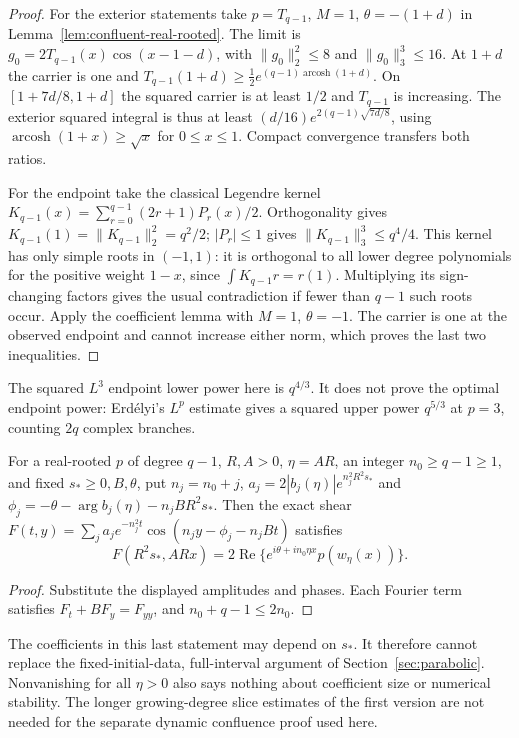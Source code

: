 \begin{proof}
For the exterior statements take $p=T_{q-1}$, $M=1$,
$\theta=-(1+d)$ in Lemma~\ref{lem:confluent-real-rooted}.
The limit is $g_0=2T_{q-1}(x)\cos(x-1-d)$, with
$\|g_0\|_2^2\le8$ and $\|g_0\|_3^3\le16$.
At $1+d$ the carrier is one and
$T_{q-1}(1+d)\ge\tfrac12e^{(q-1)\operatorname{arcosh}(1+d)}$.
On $[1+7d/8,1+d]$ the squared carrier is at least $1/2$ and
$T_{q-1}$ is increasing. The exterior squared integral is thus at least
$(d/16)e^{2(q-1)\sqrt{7d/8}}$, using
$\operatorname{arcosh}(1+x)\ge\sqrt x$ for $0\le x\le1$.
Compact convergence transfers both ratios.

For the endpoint take the classical Legendre kernel
$K_{q-1}(x)=\sum_{r=0}^{q-1}(2r+1)P_r(x)/2$.
Orthogonality gives $K_{q-1}(1)=\|K_{q-1}\|_2^2=q^2/2$;
$|P_r|\le1$ gives $\|K_{q-1}\|_3^3\le q^4/4$.
This kernel has only simple roots in $(-1,1)$: it is orthogonal to
all lower degree polynomials for the positive weight $1-x$, since
$\int K_{q-1}r=r(1)$. Multiplying its sign-changing factors gives
the usual contradiction if fewer than $q-1$ such roots occur.
Apply the coefficient lemma with $M=1$, $\theta=-1$.
The carrier is one at the observed endpoint and cannot increase either
norm, which proves the last two inequalities.
\end{proof}

The squared $L^3$ endpoint lower power here is $q^{4/3}$.
It does not prove the optimal endpoint power: Erd\'elyi's
$L^p$ estimate \cite[Theorem 2.10, arXiv v1]{Erdelyi2017}
gives a squared upper power $q^{5/3}$ at $p=3$, counting $2q$
complex branches.

\begin{proposition}
\label{thm:integer-slice}
For a real-rooted $p$ of degree $q-1$, $R,A>0$, $\eta=AR$,
an integer $n_0\ge q-1\ge1$, and fixed $s_*\ge0,B,\theta$, put
$n_j=n_0+j$, $a_j=2|b_j(\eta)|e^{n_j^2R^2s_*}$ and
$\phi_j=-\theta-\arg b_j(\eta)-n_jBR^2s_*$.
Then the exact shear
$F(t,y)=\sum_j a_je^{-n_j^2t}\cos(n_jy-\phi_j-n_jBt)$ satisfies
\[
 F(R^2s_*,ARx)=2\operatorname{Re}
       \{e^{i\theta+in_0\eta x}p(w_\eta(x))\}.
\]
\end{proposition}

\begin{proof}
Substitute the displayed amplitudes and phases. Each Fourier term
satisfies $F_t+BF_y=F_{yy}$, and $n_0+q-1\le2n_0$.
\end{proof}

The coefficients in this last statement may depend on $s_*$.
It therefore cannot replace the fixed-initial-data, full-interval
argument of Section~\ref{sec:parabolic}. Nonvanishing for all
$\eta>0$ also says nothing about coefficient size or numerical stability.
The longer growing-degree slice estimates of the first version are
not needed for the separate dynamic confluence proof used here.
